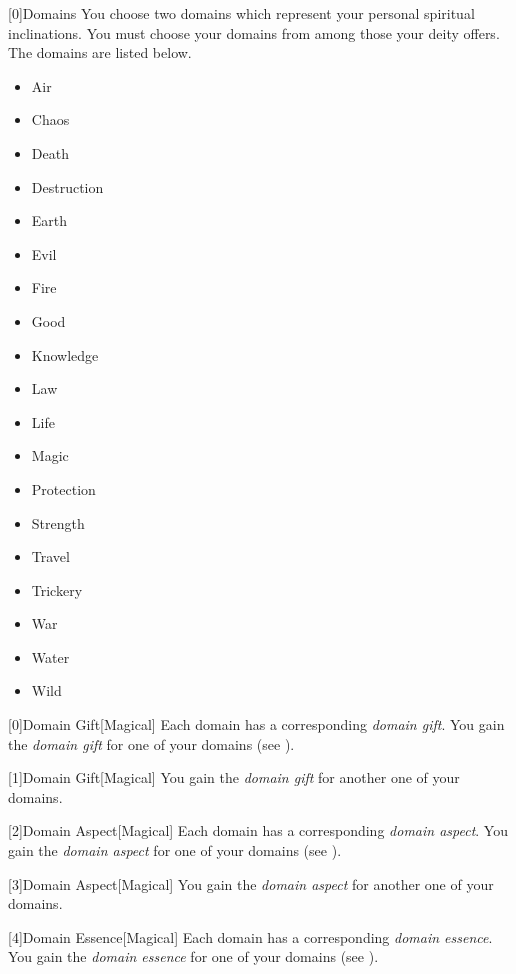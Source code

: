         [0]{Domains}
        You choose two domains which represent your personal spiritual inclinations.
        You must choose your domains from among those your deity offers.
        The domains are listed below.

        \begin{itemize}
            \item{Air}
            \item{Chaos}
            \item{Death}
            \item{Destruction}
            \item{Earth}
            \item{Evil}
            \item{Fire}
            \item{Good}
            \item{Knowledge}
            \item{Law}
            \item{Life}
            \item{Magic}
            \item{Protection}
            \item{Strength}
            \item{Travel}
            \item{Trickery}
            \item{War}
            \item{Water}
            \item{Wild}
        \end{itemize}

        [0]{Domain Gift}[Magical]
        Each domain has a corresponding \textit{domain gift}.
        You gain the \textit{domain gift} for one of your domains (see ).

        [1]{Domain Gift}[Magical]
        You gain the \textit{domain gift} for another one of your domains.

        [2]{Domain Aspect}[Magical]
        Each domain has a corresponding \textit{domain aspect}.
        You gain the \textit{domain aspect} for one of your domains (see ).

        [3]{Domain Aspect}[Magical]
        You gain the \textit{domain aspect} for another one of your domains.

        [4]{Domain Essence}[Magical]
        Each domain has a corresponding \textit{domain essence}.
        You gain the \textit{domain essence} for one of your domains (see ).

